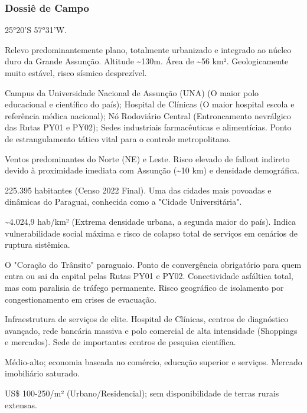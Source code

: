 \subsubsection{Dossiê de Campo}
\begin{description}[style=nextline,leftmargin=0.5cm,font=\bfseries]
\item[Coordenadas]  25°20'S 57°31'W.
\item[Topografia]  Relevo predominantemente plano, totalmente urbanizado e integrado ao núcleo duro da Grande Assunção. Altitude \textasciitilde 130m. Área de \textasciitilde 56 km². Geologicamente muito estável, risco sísmico desprezível.
\item[Alvos Estratégicos]  Campus da Universidade Nacional de Assunção (UNA) (O maior polo educacional e científico do país); Hospital de Clínicas (O maior hospital escola e referência médica nacional); Nó Rodoviário Central (Entroncamento nevrálgico das Rutas PY01 e PY02); Sedes industriais farmacêuticas e alimentícias. Ponto de estrangulamento tático vital para o controle metropolitano.
\item[Fallout]  Ventos predominantes do Norte (NE) e Leste. Risco elevado de fallout indireto devido à proximidade imediata com Assunção (\textasciitilde 10 km) e densidade demográfica.
\item[População]  225.395 habitantes (Censo 2022 Final). Uma das cidades mais povoadas e dinâmicas do Paraguai, conhecida como a "Cidade Universitária".
\item[Densidade]  \textasciitilde 4.024,9 hab/\allowbreak km² (Extrema densidade urbana, a segunda maior do país). Indica vulnerabilidade social máxima e risco de colapso total de serviços em cenários de ruptura sistêmica.
\item[Vias de Acesso]  O "Coração do Trânsito" paraguaio. Ponto de convergência obrigatório para quem entra ou sai da capital pelas Rutas PY01 e PY02. Conectividade asfáltica total, mas com paralisia de tráfego permanente. Risco geográfico de isolamento por congestionamento em crises de evacuação.
\item[Serviços]  Infraestrutura de serviços de elite. Hospital de Clínicas, centros de diagnóstico avançado, rede bancária massiva e polo comercial de alta intensidade (Shoppings e mercados). Sede de importantes centros de pesquisa científica.
\item[Custo de Vida]  Médio-alto; economia baseada no comércio, educação superior e serviços. Mercado imobiliário saturado.
\item[Preço da Terra]  US\$ 100-250/\allowbreak m² (Urbano/\allowbreak Residencial); sem disponibilidade de terras rurais extensas.

\end{description}
